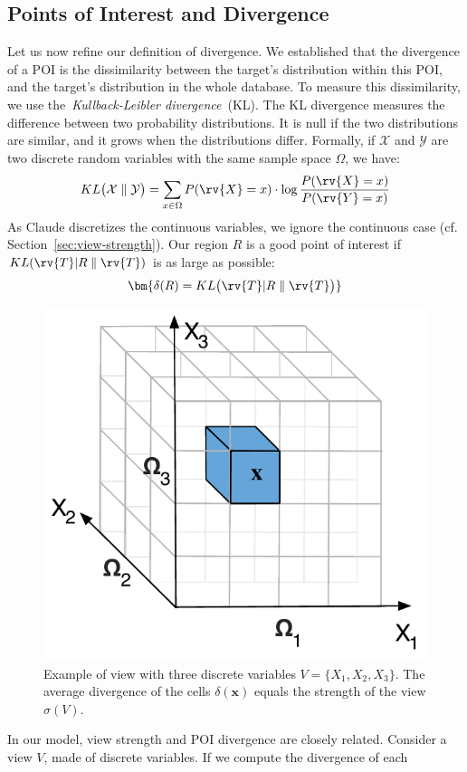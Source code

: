 \subsection{Points of Interest and Divergence}
Let us now refine our definition of divergence. We established that the
divergence of a POI is the dissimilarity between the target's distribution
within this POI, and the target's distribution in the whole
database.  To measure this dissimilarity, we use the~\emph{Kullback-Leibler
divergence}~(KL).  The KL divergence measures the difference between two
probability distributions. It is null if the two distributions are similar, and
it grows when the distributions differ.  Formally, if $\mathcal{X}$ and
$\mathcal{Y}$ are two discrete random variables with the same sample space
$\Omega$, we have:
\begin{equation}\label{eq:KL_disc} 
    KL\big( \mathcal{X} \parallel \mathcal{Y} \big) = 
    \sum_{x\in \Omega} P(\rv{X} = x) \cdot \log{\frac{P(\rv{X} = x)}{P(\rv{Y} = x)}} 
\end{equation}
As Claude discretizes the continuous variables, we ignore the continuous case
(cf.  Section~\ref{sec:view-strength}). Our region $R$ is a good point of
interest if $KL ( \rv{T} |R \parallel \rv{T} )$ is as large as possible:
\begin{equation}\label{eq:divergence}\bm{
    \delta(R) = KL \big( \rv{T} | R \parallel \rv{T}\big)
}\end{equation}
\begin{figure}[t!]
\centering
\includegraphics[width=0.5\columnwidth]{images/3Dtest}
\caption{Example of view with three discrete variables $V = \{X_1, X_2, X_3\}$.
The average divergence of the cells $\delta(\mathbf{x})$ equals the strength of
the view  $\sigma(V)$.}
\label{fig:binningexample}
\end{figure}
In our model, view strength and POI divergence are closely related.  Consider a
view $V$, made of discrete variables. If we compute the divergence of each
